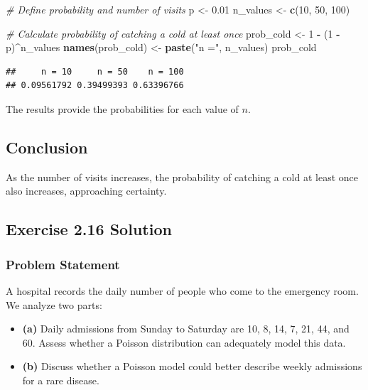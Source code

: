 \documentclass[
]{article}
\newenvironment{Shaded}{\begin{snugshade}}{\end{snugshade}}
\newcommand{\CommentTok}[1]{\textcolor[rgb]{0.56,0.35,0.01}{\textit{#1}}}
\newcommand{\DecValTok}[1]{\textcolor[rgb]{0.00,0.00,0.81}{#1}}
\newcommand{\FloatTok}[1]{\textcolor[rgb]{0.00,0.00,0.81}{#1}}
\newcommand{\FunctionTok}[1]{\textcolor[rgb]{0.13,0.29,0.53}{\textbf{#1}}}
\newcommand{\NormalTok}[1]{#1}
\newcommand{\OtherTok}[1]{\textcolor[rgb]{0.56,0.35,0.01}{#1}}
\newcommand{\SpecialCharTok}[1]{\textcolor[rgb]{0.81,0.36,0.00}{\textbf{#1}}}
\newcommand{\StringTok}[1]{\textcolor[rgb]{0.31,0.60,0.02}{#1}}
\providecommand{\tightlist}{%
  \setlength{\itemsep}{0pt}\setlength{\parskip}{0pt}}
\begin{document}
\begin{Shaded}
\begin{Highlighting}[]
\CommentTok{\# Define probability and number of visits}
\NormalTok{p }\OtherTok{\textless{}{-}} \FloatTok{0.01}
\NormalTok{n\_values }\OtherTok{\textless{}{-}} \FunctionTok{c}\NormalTok{(}\DecValTok{10}\NormalTok{, }\DecValTok{50}\NormalTok{, }\DecValTok{100}\NormalTok{)}

\CommentTok{\# Calculate probability of catching a cold at least once}
\NormalTok{prob\_cold }\OtherTok{\textless{}{-}} \DecValTok{1} \SpecialCharTok{{-}}\NormalTok{ (}\DecValTok{1} \SpecialCharTok{{-}}\NormalTok{ p)}\SpecialCharTok{\^{}}\NormalTok{n\_values}
\FunctionTok{names}\NormalTok{(prob\_cold) }\OtherTok{\textless{}{-}} \FunctionTok{paste}\NormalTok{(}\StringTok{"n ="}\NormalTok{, n\_values)}
\NormalTok{prob\_cold}
\end{Highlighting}
\end{Shaded}

\begin{verbatim}
##     n = 10     n = 50    n = 100 
## 0.09561792 0.39499393 0.63396766
\end{verbatim}

The results provide the probabilities for each value of \(n\).

\hypertarget{conclusion}{%
\subsection{Conclusion}\label{conclusion}}

As the number of visits increases, the probability of catching a cold at
least once also increases, approaching certainty.

\hypertarget{exercise-2.16-solution}{%
\subsection{Exercise 2.16 Solution}\label{exercise-2.16-solution}}

\hypertarget{problem-statement-1}{%
\subsubsection{Problem Statement}\label{problem-statement-1}}

A hospital records the daily number of people who come to the emergency
room. We analyze two parts:

\begin{itemize}
\tightlist
\item
  \textbf{(a)} Daily admissions from Sunday to Saturday are 10, 8, 14,
  7, 21, 44, and 60. Assess whether a Poisson distribution can
  adequately model this data.
\item
  \textbf{(b)} Discuss whether a Poisson model could better describe
  weekly admissions for a rare disease.
\end{itemize}
\end{document}

